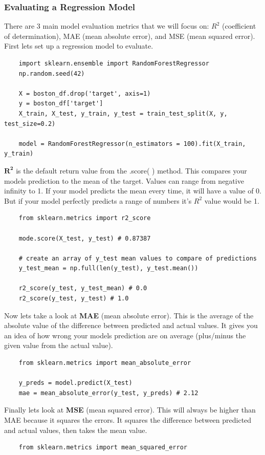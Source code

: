 \documentclass[11pt, a4paper]{article}
\begin{document}
\begin{spacing}{1.1}
	\subsubsection{Evaluating a Regression Model}
	There are 3 main model evaluation metrics that we will focus on: $R^2$ (coefficient of determination), MAE (mean absolute error), and MSE (mean squared error). First lets set up a regression model to evaluate.
	\begin{lstlisting}
	import sklearn.ensemble import RandomForestRegressor
	np.random.seed(42)
	
	X = boston_df.drop('target', axis=1)
	y = boston_df['target']
	X_train, X_test, y_train, y_test = train_test_split(X, y, test_size=0.2)
	
	model = RandomForestRegressor(n_estimators = 100).fit(X_train, y_train)	\end{lstlisting} \vspace*{1mm}
	$\mathbf{R^2}$ is the default return value from the .score( ) method. This compares your models prediction to the mean of the target. Values can range from negative infinity to 1. If your model predicts the mean every time, it will have a value of 0. But if your model perfectly predicts a range of numbers it's $R^2$ value would be 1.
	\begin{lstlisting}
	from sklearn.metrics import r2_score
	
	mode.score(X_test, y_test) # 0.87387
	
	# create an array of y_test mean values to compare of predictions
	y_test_mean = np.full(len(y_test), y_test.mean()) 
	
	r2_score(y_test, y_test_mean) # 0.0
	r2_score(y_test, y_test) # 1.0	\end{lstlisting} \vspace*{1mm}
	Now lets take a look at \textbf{MAE} (mean absolute error). This is the average of the absolute value of the difference between predicted and actual values. It gives you an idea of how wrong your models prediction are on average (plus/minus the given value from the actual value). 
	\begin{lstlisting}
	from sklearn.metrics import mean_absolute_error
	
	y_preds = model.predict(X_test)
	mae = mean_absolute_error(y_test, y_preds) # 2.12 \end{lstlisting} \vspace*{1mm}
	Finally lets look at \textbf{MSE} (mean squared error). This will always be higher than MAE because it squares the errors. It squares the difference between predicted and actual values, then takes the mean value.	
	\begin{lstlisting}
	from sklearn.metrics import mean_squared_error
	

\end{lstlisting}
\end{spacing}
\end{document}
